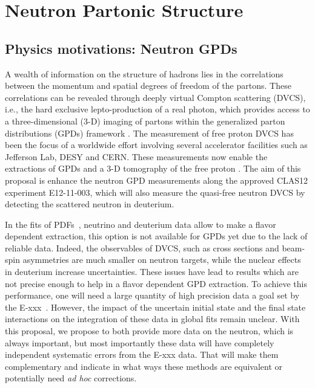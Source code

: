 \chapter{Neutron Partonic Structure}
\label{chap:physics}

\section{Physics motivations: Neutron GPDs}

A wealth of information on the structure of hadrons lies in the correlations 
between the momentum and spatial degrees of freedom of the partons. These 
correlations can be revealed through deeply virtual Compton scattering (DVCS), 
i.e., the hard exclusive lepto-production of a real photon, which provides 
access to a three-dimensional (3-D) imaging of partons within the generalized 
parton distributions (GPDs) framework 
\cite{Mueller:1998fv,PhysRevLett.78.610,PhysRevD.55.7114,Radyushkin:1996nd,PhysRevD.56.5524}.   
The measurement of free proton DVCS has been the focus of a worldwide effort 
\cite{PhysRevLett.87.182002,
   PhysRevLett.87.182001,
   PhysRevD.75.011103,
   Girod:2007aa,
   PhysRevC.92.055202,
   PhysRevLett.99.242501,
   PhysRevC.80.035206,
   PhysRevLett.114.032001,
   Jo:2015ema}
involving several accelerator facilities such as Jefferson Lab, DESY and  
CERN. These measurements now enable the extractions of GPDs and a 3-D 
tomography of the free proton \cite{Guidal:2013rya, PhysRevD.95.011501}. The 
aim of this proposal is enhance the neutron GPD measurements along the approved 
CLAS12 experiment E12-11-003, which will also measure the quasi-free neutron 
DVCS by detecting the scattered neutron in deuterium.  

In the fits of PDFs~\cite{}, neutrino and deuterium data allow to make
a flavor dependent extraction, this option is not available for GPDs yet due to 
the lack of reliable data. Indeed, the observables of DVCS, such as cross sections
and beam-spin asymmetries are much smaller on neutron targets, while the nuclear
effects in deuterium increase uncertainties. These issues have lead to results
\cite{} which are not precise enough to help in a flavor dependent GPD extraction.
To achieve this performance, one will need a large quantity of high precision data
a goal set by the E-xxx~\cite{}. However, the impact of the uncertain initial state and the
final state interactions on the integration of these data in global fits remain 
unclear. With this proposal, we propose to both provide more data on the neutron,
which is always important, but most importantly these data will have completely 
independent systematic errors from the E-xxx data. That will make them complementary
and indicate in what ways these methods are equivalent or potentially need {\it ad hoc}
corrections.

